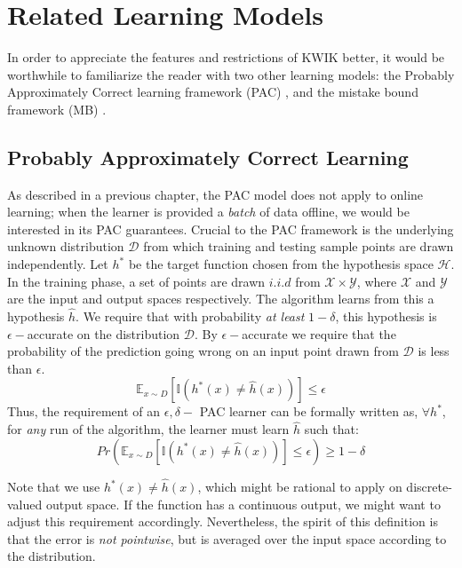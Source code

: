 
\section{Related Learning Models}

In order to appreciate the features and restrictions of KWIK better, it would be worthwhile to familiarize the reader with two other learning models: the Probably Approximately Correct learning framework (PAC) \citet{Valiant:1984:TL:1968.1972}, and the mistake bound framework (MB) \citet{Littlestone:1987:LQI:1382440.1383019}. 


\subsection{Probably Approximately Correct Learning}
As described in a previous chapter, the PAC model does not apply to online learning; when the learner is provided a \textit{batch} of data offline, we would be interested in its PAC guarantees. Crucial to the PAC framework is the underlying unknown distribution $\mathcal{D}$ from which training and testing sample points are drawn independently. Let $h^*$ be the target function chosen from the hypothesis space $\mathcal{H}$. In the training phase,  a set of points are drawn $i.i.d$ from $\mathcal{X} \times \mathcal{Y}$, where $\mathcal{X}$ and $\mathcal{Y}$ are the input and output spaces respectively. The algorithm learns from this a hypothesis $\hat{h}$. We require that with probability \textit{at least} $1-\delta$, this hypothesis is $\epsilon-$accurate on the distribution $\mathcal{D}$. By $\epsilon-$accurate we require that the probability of the prediction going wrong  on an input point drawn from $\mathcal{D}$ is less than $\epsilon$.
\begin{equation}
\mathbb{E}_{x \sim D} \left[\mathbb{I}(h^*(x) \neq \hat{h}(x))\right] \leq \epsilon
\end{equation}
Thus, the requirement of an $\epsilon,\delta-$ PAC learner can be formally written as, $\forall h^*$, for \textit{any} run of the algorithm, the learner must learn $\hat{h}$ such that:
\begin{equation}
Pr \left( \mathbb{E}_{x \sim D} \left[\mathbb{I}(h^*(x) \neq \hat{h}(x))\right] \leq \epsilon
 \right) \geq 1 - \delta
\end{equation}

Note that we use $h^*(x) \neq \hat{h}(x)$, which might be rational to apply on discrete-valued output space. If the function has a continuous output, we might want to adjust this requirement accordingly. Nevertheless, the spirit of this definition is that the error is \textit{not pointwise}, but is averaged over the input space according to the distribution. \\

